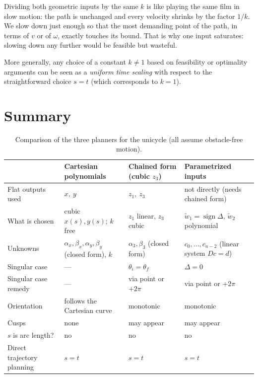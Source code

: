 \documentclass[11pt,a4paper]{article}
\def\boldsymbol#1{#1}%
\DeclareMathOperator{\sign}{sign}
\newcommand{\wwt}{\tilde w}
\theoremstyle{definition}
\theoremstyle{plain}
\theoremstyle{remark}
\begin{document}
\begin{intuition}
Dividing both geometric inputs by the same $k$ is like playing the same film in slow motion: the path is unchanged and every
velocity shrinks by the factor $1/k$. We slow down just enough so that the most demanding point of the path, in terms of
$v$ or of $\omega$, exactly touches its bound. That is why one input saturates: slowing down any further would be feasible but wasteful.
\end{intuition}
 
More generally, any choice of a constant $k\ne1$ based on feasibility or optimality arguments can be seen as a \emph{uniform time
scaling} with respect to the straightforward choice $s=t$ (which corresponds to $k=1$).
\section{Summary}

\begin{table}[h]
\centering
\small
\renewcommand{\arraystretch}{1.25}
\begin{tabular}{@{}p{3.2cm}p{3.7cm}p{3.7cm}p{3.7cm}@{}}
\toprule
 & \textbf{Cartesian polynomials} & \textbf{Chained form (cubic $z_3$)} & \textbf{Parametrized inputs}\\
\midrule
Flat outputs used & $x,\ y$ & $z_1,\ z_3$ & not directly (needs chained form)\\
What is chosen & cubic $x(s),y(s)$; $k$ free & $z_1$ linear, $z_3$ cubic & $\wwt_1=\sign\Delta$, $\wwt_2$ polynomial\\
Unknowns & $\alpha_x,\beta_x,\alpha_y,\beta_y$ (closed form), $k$ & $\alpha_3,\beta_3$ (closed form) & $c_0,\dots,c_{n-2}$ (linear system $D\boldsymbol c=\boldsymbol d$)\\
Singular case & --- & $\theta_i=\theta_f$ & $\Delta=0$\\
Singular case remedy & --- & via point or $+2\pi$ & via point or $+2\pi$\\
Orientation & follows the Cartesian curve & monotonic & monotonic\\
Cusps & none & may appear & may appear\\
$s$ is arc length? & no & no & no\\
Direct trajectory planning & $s=t$ & $s=t$ & $s=t$\\
\bottomrule
\end{tabular}
\caption{Comparison of the three planners for the unicycle (all assume obstacle-free motion).}
\end{table}
\end{document}

